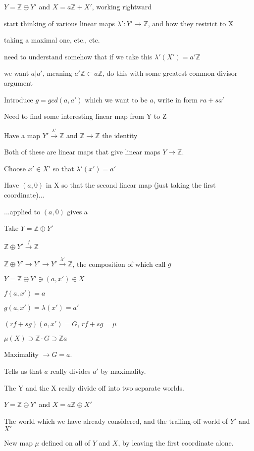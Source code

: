 \documentclass[12pt]{article}
\begin{document}
\noindent
$Y = \mathds{Z} \oplus Y'$ and $X = a\mathds{Z} + X'$, working rightward

start thinking of various linear maps $\lambda': Y' \to \mathds{Z}$, and how they restrict to X

taking a maximal one, etc., etc.

need to understand somehow that if we take this $\lambda'(X') = a'\mathds{Z}$

we want $a | a'$, meaning $a'\mathds{Z} \subset a\mathds{Z}$, do this with some greatest common divisor argument

\noindent
Introduce $g = gcd(a, a')$ which we want to be $a$, write in form $ra + sa'$

Need to find some interesting linear map from Y to Z

Have a map $Y' \xrightarrow{\lambda'} \mathds{Z}$ and $\mathds{Z} \to \mathds{Z}$ the identity

Both of these are linear maps that give linear maps $Y \to \mathds{Z}$.

Choose $x' \in X'$ so that $\lambda'(x') = a'$

Have $(a, 0)$ in X so that the second linear map (just taking the first coordinate)...

...applied to $(a, 0)$ gives a

\noindent
Take $Y = \mathds{Z} \oplus Y'$

$\mathds{Z} \oplus Y' \xrightarrow{f} \mathds{Z}$

$\mathds{Z} \oplus Y' \to Y' \to Y' \xrightarrow{\lambda'} \mathds{Z}$, the composition of which call $g$

$Y = \mathds{Z} \oplus Y' \ni (a, x') \in X$

$f(a, x') = a$

$g(a, x') = \lambda(x') = a'$

$(rf + sg)(a, x') = G$, $rf + sg = \mu$

\noindent
$\mu(X) \supset \mathds{Z} \cdot G \supset \mathds{Z}a$

Maximality $\to G = a$.

Tells us that $a$ really divides $a'$ by maximality.

\noindent
The Y and the X really divide off into two separate worlds.

$Y = \mathds{Z} \oplus Y'$ and $X = a\mathds{Z} \oplus X'$

The world which we have already considered, and the trailing-off world of $Y'$ and $X'$

New map $\mu$ defined on all of $Y$ and $X$, by leaving the first coordinate alone.
\end{document}
